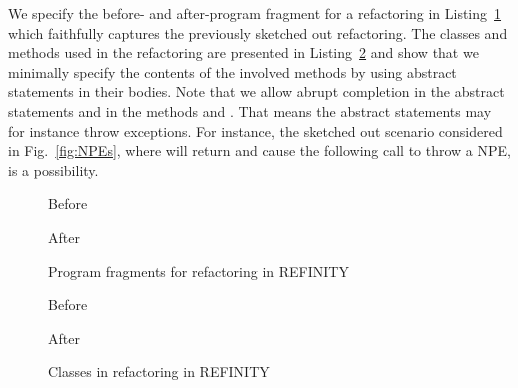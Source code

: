 We specify the before- and after-program fragment for a  refactoring in Listing~\ref{lst:HideDelegate-nofields-refinity} which faithfully captures the previously sketched out refactoring.
The classes and methods used in the refactoring are presented in Listing~\ref{lst:HideDelegate-nofields-classes-refinity} and show that we minimally specify the contents of the involved methods by using abstract statements in their bodies.
Note that we allow abrupt completion in the abstract statements  and  in the methods  and .
That means the abstract statements may for instance throw exceptions.  For instance, the sketched out scenario considered in Fig.~\ref{fig:NPEs}, where  will return  and cause the following call to throw a NPE, is a possibility.

\begin{figure}[tbp]
  \captionsetup{type=lstlisting}
  \centering
  \begin{sublstlisting}[b]{.455\linewidth}
    
    \caption{Before}
    \label{lst:HideDelegate-nofields-before-refinity}
  \end{sublstlisting}\hspace{1cm}
  \begin{sublstlisting}[b]{.455\linewidth}
    
    \caption{After}
    \label{lst:HideDelegate-nofields-after-refinity}
  \end{sublstlisting}
\caption{Program fragments for  refactoring in REFINITY}
\label{lst:HideDelegate-nofields-refinity}
\end{figure}

\begin{figure}[tbp]
  \captionsetup{type=lstlisting}
  \centering
  \begin{sublstlisting}[b]{.4\linewidth}
    
    \caption{Before}
    \label{lst:HideDelegate-nofields-resource-refinity}
  \end{sublstlisting}\hspace{1cm}
  \begin{sublstlisting}[b]{.4\linewidth}
    
    \caption{After}
    \label{lst:HideDelegate-nofields-owner-refinity}
  \end{sublstlisting}
\caption{Classes in  refactoring in REFINITY}
\label{lst:HideDelegate-nofields-classes-refinity}
\end{figure}


